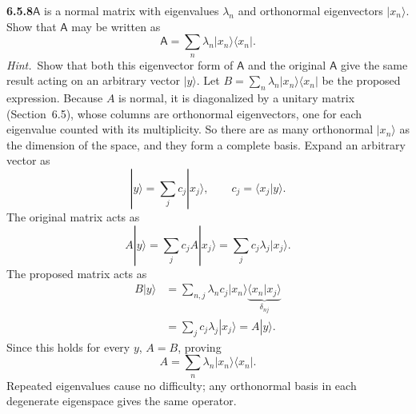\par\bigskip
\noindent\textbf{6.5.8}\quad $\mathsf{A}$ is a normal matrix with eigenvalues
$\lambda_{n}$ and orthonormal eigenvectors $|x_{n}\rangle$. Show that
$\mathsf{A}$ may be written as
\[
\mathsf{A}=\sum_{n}\lambda_{n}|x_{n}\rangle\langle x_{n}|.
\]
\emph{Hint.}~Show that both this eigenvector form of $\mathsf{A}$ and the
original $\mathsf{A}$ give the same result acting on an arbitrary vector
$|y\rangle$.
\solution
Let
$B=\sum_n\lambda_n|x_n\rangle\langle x_n|$ be the proposed expression.
Because $A$ is normal, it is diagonalized by a unitary matrix
(Section~6.5), whose columns are orthonormal eigenvectors, one for each
eigenvalue counted with its multiplicity. So there are as many
orthonormal $|x_n\rangle$ as the dimension of the space, and they form
a complete basis. Expand an arbitrary vector as
\[
|y\rangle=\sum_j c_j|x_j\rangle,
\qquad c_j=\langle x_j|y\rangle.
\]
The original matrix acts as
\[
A|y\rangle=\sum_jc_jA|x_j\rangle
=\sum_jc_j\lambda_j|x_j\rangle.
\]
The proposed matrix acts as
\begin{align*}
B|y\rangle
&=\sum_{n,j}\lambda_nc_j|x_n\rangle
 \underbrace{\langle x_n|x_j\rangle}_{\delta_{nj}}\\
&=\sum_jc_j\lambda_j|x_j\rangle=A|y\rangle.
\end{align*}
Since this holds for every $y$, $A=B$, proving
\[
\boxed{A=\sum_n\lambda_n|x_n\rangle\langle x_n|.}
\]
Repeated eigenvalues cause no difficulty; any orthonormal basis in each
degenerate eigenspace gives the same operator.

